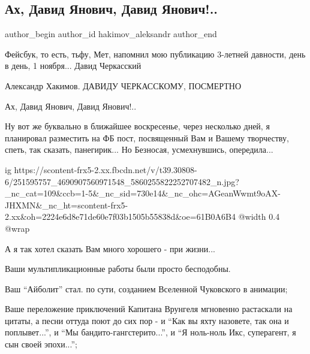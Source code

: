  
 
 
 
 
 
\subsection{Ах, Давид Янович, Давид Янович!..}
\label{sec:01_11_2021.fb.hakimov_aleksandr.1.david_janovich}
 
\ifcmt
 author_begin
   author_id hakimov_aleksandr
 author_end
\fi

Фейсбук, то есть, тьфу, Мет, напомнил мою публикацию 3-летней давности, день в
день, 1 ноября...  Давид Черкасский 

Александр Хакимов. ДАВИДУ  ЧЕРКАССКОМУ,  ПОСМЕРТНО

Ах, Давид Янович, Давид Янович!..

Ну вот же буквально в ближайшее воскресенье, через несколько дней, я планировал
разместить на ФБ пост, посвященный Вам и Вашему творчеству, спеть, так сказать,
панегирик... Но Безносая, усмехнувшись, опередила...

\ifcmt
  ig https://scontent-frx5-2.xx.fbcdn.net/v/t39.30808-6/251595757_4690907560971548_5860255822252707482_n.jpg?_nc_cat=109&ccb=1-5&_nc_sid=730e14&_nc_ohc=AGeanWwmt9oAX-JHXMN&_nc_ht=scontent-frx5-2.xx&oh=2224e6d8e71de60e7f03b1505b55838d&oe=61B0A6B4
  @width 0.4
  @wrap 
\fi

А я так хотел сказать Вам много хорошего - при жизни...

Ваши мультипликационные работы были просто бесподобны.

Ваш \enquote{Айболит} стал. по сути, созданием Вселенной Чуковского в анимации;

Ваше переложение приключений Капитана Врунгеля мгновенно растаскали на цитаты,
а песни оттуда поют до сих пор - и \enquote{Как вы яхту назовете, так она и
поплывет...}, и \enquote{Мы бандито-гангстерито...}, и \enquote{Я ноль-ноль Икс, суперагент, я
сын своей эпохи...};


